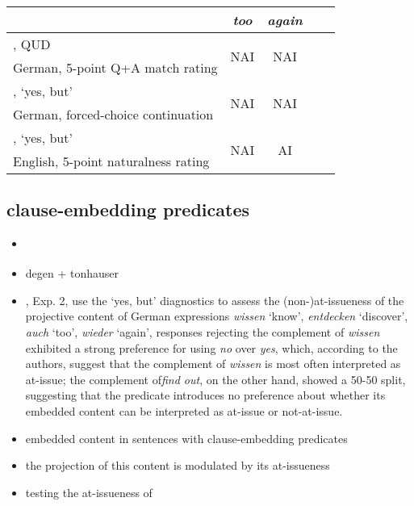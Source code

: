     \begin{tabular}{l c c c c}\toprule
            & \emph{too} 
              & \emph{again}
                        \\\midrule
        
        \citealt{chen_presuppositions_2024}, QUD
            & \multirow{2}{*}{NAI}
              & \multirow{2}{*}{NAI}
                        \\ 
        \scriptsize German, 5-point Q+A match rating  &  \\ \midrule

        \citealt{xue_correlation_2011}, `yes, but'
            & \multirow{2}{*}{NAI}
              & \multirow{2}{*}{NAI}
                        \\ 
        \scriptsize German, forced-choice continuation  &  \\ \midrule

        \citealt{cummins_backgrounding_2013}, `yes, but'
            & \multirow{2}{*}{NAI}
              & \multirow{2}{*}{AI}
                        \\ 
        \scriptsize English, 5-point naturalness rating   &  \\ \midrule

    \end{tabular}

  \subsection{clause-embedding predicates}
    \begin{itemize}
      \item \citealt{tonhauser_how_2018}
      \item degen + tonhauser

      \item \citealt{xue_correlation_2011}, Exp. 2, use the `yes, but' diagnostics to assess the (non-)at-issueness of the projective content of German expressions \emph{wissen} `know',  \emph{entdecken} `discover',  \emph{auch} `too',  \emph{wieder} `again',  responses rejecting the complement of \emph{wissen} exhibited a strong preference for using \emph{no} over \emph{yes}, which, according to the authors, suggest that the complement of \emph{wissen} is most often interpreted as at-issue; the complement of\emph{find out}, on the other hand, showed a 50-50 split, suggesting that the predicate introduces no preference about whether its embedded content can be interpreted as at-issue or not-at-issue.

    \end{itemize}

    \begin{itemize}
      \item embedded content in sentences with clause-embedding predicates 
      \item the projection of this content is modulated by its at-issueness
      \item testing the at-issueness of 

    \end{itemize}